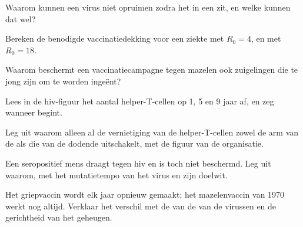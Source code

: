 \begin{exercise}[$\star\star$]\label{exo:g12:adaptive-immunity:8}
Waarom kunnen  een virus niet opruimen zodra het in een 
zit, en welke  kunnen dat wel?
\end{exercise}

\begin{exercise}[$\star\star$]\label{exo:g12:adaptive-immunity:9}
Bereken de benodigde vaccinatiedekking voor een ziekte met $R_0 = 4$, en
met $R_0 = 18$.
\end{exercise}

\begin{exercise}[$\star\star$]\label{exo:g12:adaptive-immunity:10}
Waarom beschermt een vaccinatiecampagne tegen mazelen ook zuigelingen die
te jong zijn om te worden ingeënt?
\end{exercise}

\begin{exercise}[$\star\star$]\label{exo:g12:adaptive-immunity:11}
Lees in de hiv-figuur het aantal helper-T-cellen op 1, 5 en 9 jaar af, en
zeg wanneer  begint.
\end{exercise}

\begin{exercise}[$\star\star\star$]\label{exo:g12:adaptive-immunity:12}
Leg uit waarom alleen al de vernietiging van de helper-T-cellen zowel de
arm van de  als die van de dodende  uitschakelt, met de
figuur van de organisatie.
\end{exercise}

\begin{exercise}[$\star\star\star$]\label{exo:g12:adaptive-immunity:13}
Een seropositief mens draagt  tegen hiv en is toch niet
beschermd. Leg uit waarom, met het mutatietempo van het virus en zijn
doelwit.
\end{exercise}

\begin{exercise}[$\star\star\star$]\label{exo:g12:adaptive-immunity:14}
Het griepvaccin wordt elk jaar opnieuw gemaakt; het mazelenvaccin van 1970
werkt nog altijd. Verklaar het verschil met de  van de
 van de virussen en de gerichtheid van het geheugen.
\end{exercise}

